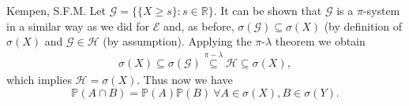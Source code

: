 \begin{solution}[5.3]{Kempen, S.F.M.}
    \noindent Let $\mathcal{G} = \{\{X\geq s\}: s\in \mathbb{R}\}$. It can be shown that $\mathcal{G}$ is a $\pi$-system in a similar way as we did for $\mathcal{E}$ and, as before, $\sigma(\mathcal{G}) \subseteq \sigma(X)$ (by definition of $\sigma(X)$ and $\mathcal{G} \in \mathcal{H}$ (by assumption). Applying the $\pi$-$\lambda$ theorem we obtain
    \begin{align*}
        \sigma(X) \subseteq \sigma(\mathcal{G}) \stackrel{\pi-\lambda}{\subseteq} \mathcal{H} \subseteq \sigma(X),
    \end{align*}
    which implies $\mathcal{H} = \sigma(X)$. Thus now we have
    $$ \mathbb{P}(A\cap B) = \mathbb{P}(A)\mathbb{P}(B) \ \forall A\in \sigma(X), B\in \sigma(Y).  $$

\end{solution}